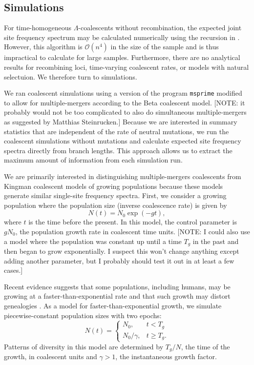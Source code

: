 \documentclass[11pt, letterpaper]{article}   	%
\begin{document}
\subsection{Simulations}

For time-homogeneous $\Lambda$-coalescents without recombination, the expected joint site frequency spectrum may be calculated numerically using the recursion in \cite{birkner:etal:2013}.
However, this algorithm is $\mathcal{O}(n^4)$ in the size of the sample and is thus impractical to calculate for large samples.
Furthermore, there are no analytical results for recombining loci, time-varying coalescent rates, or models with natural selectuion.
We therefore turn to simulations.

We ran coalescent simulations using a version of the program \texttt{msprime} \cite{msprime} modified to allow for multiple-mergers according to the Beta coalescent model.
[NOTE: it probably would not be too complicated to also do simultaneous multiple-mergers as suggested by Matthias Steinrucken.]
Because we are interested in summary statistics that are independent of the rate of neutral mutations, we run the coalescent simulations without mutations and calculate expected site frequency spectra directly from branch lengths.
This approach allows us to extract the maximum amount of information from each simulation run.

We are primarily interested in distinguishing multiple-mergers coalescents from Kingman coalescent models of growing populations because these models generate similar single-site frequency spectra.
First, we consider a growing population where the population size (inverse coalescence rate) is given by
\begin{equation} N(t) = N_0 \exp (- gt),\end{equation}
 where $t$ is the time before the present.
In this model, the control parameter is $gN_0$, the population growth rate in coalescent time units.
[NOTE: I could also use a model where the population was constant up until a time $T_g$ in the past and then began to grow exponentially. I suspect this won't change anything except adding another parameter, but I probably should test it out in at least a few cases.]

Recent evidence suggests that some populations, including humans, may be growing at a faster-than-exponential rate \cite{} and that such growth may distort genealogies \cite{}.
As a model for faster-than-exponential growth, we simulate piecewise-constant population sizes with two epochs:
\begin{equation}
N(t) = 
\begin{cases}
      N_0, &  t < T_g \\
      N_0 / \gamma, & t \geq T_g.
\end{cases}
\end{equation}
Patterns of diversity in this model are determined by $T_g / N$, the time of the growth, in coalescent units and $\gamma > 1$, the instantaneous growth factor.
\end{document}
